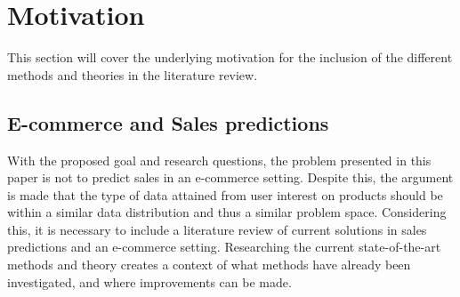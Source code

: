 \section{Motivation}
\label{section:BT:Motivation}

This section will cover the underlying motivation for the inclusion of the different methods and theories in the literature review.



\subsection{E-commerce and Sales predictions}
With the proposed goal and research questions, the problem presented in this paper is not to predict sales in an e-commerce setting.
Despite this, the argument is made that the type of data attained from user interest on products should be within a similar data distribution and thus a similar problem space.
Considering this, it is necessary to include a literature review of current solutions in sales predictions and an e-commerce setting.
Researching the current state-of-the-art methods and theory creates a context of what methods have already been investigated,
and where improvements can be made.


